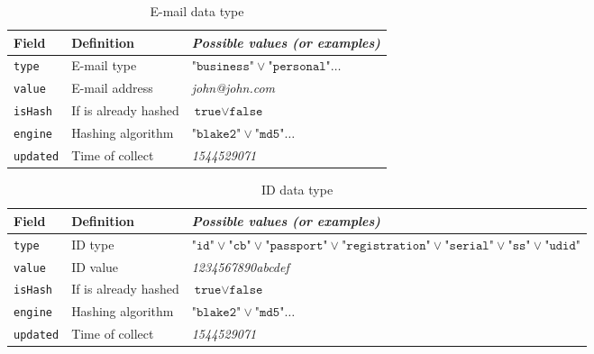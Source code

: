 \documentclass[twoside,twocolumn]{article}
\theoremstyle{definition}
\theoremstyle{remark}
\begin{document}
\begin{table}[htb]
    \centering
    \caption{E-mail data type}
    \begin{tabular*}{0.75\textwidth}{l|l||l}
        Field & Definition & \textit{Possible values (or examples)} \\
        \hline \hline
        \texttt{type} & E-mail type & $\texttt{"business"} \vee \texttt{"personal"} \dots$ \\
        \hline
        \texttt{value} & E-mail address & \textit{john@john.com} \\
        \hline
        \texttt{isHash} & If is already hashed & $\texttt{true} \vee \texttt{false}$ \\
        \hline
        \texttt{engine} & Hashing algorithm & $\texttt{"blake2"} \vee \texttt{"md5"} \dots$ \\
        \hline
        \texttt{updated} & Time of collect & \textit{1544529071}
        \label{table:emails}
    \end{tabular*}
\end{table}

\begin{table}[htb]
    \centering
    \caption{ID data type}
    \begin{tabular*}{1.13\textwidth}{l|l||l}
        Field & Definition & \textit{Possible values (or examples)} \\
        \hline \hline
        \texttt{type} & ID type & $\texttt{"id"} \vee \texttt{"cb"} \vee \texttt{"passport"} \vee \texttt{"registration"} \vee \texttt{"serial"} \vee 
            \texttt{"ss"} \vee \texttt{"udid"}$ \\
        \hline
        \texttt{value} & ID value & \textit{1234567890abcdef} \\
        \hline
        \texttt{isHash} & If is already hashed & $\texttt{true} \vee \texttt{false}$ \\
        \hline
        \texttt{engine} & Hashing algorithm & $\texttt{"blake2"} \vee \texttt{"md5"} \dots$ \\
        \hline
        \texttt{updated} & Time of collect & \textit{1544529071}
        \label{table:ids}
    \end{tabular*}
\end{table}
\end{document}
